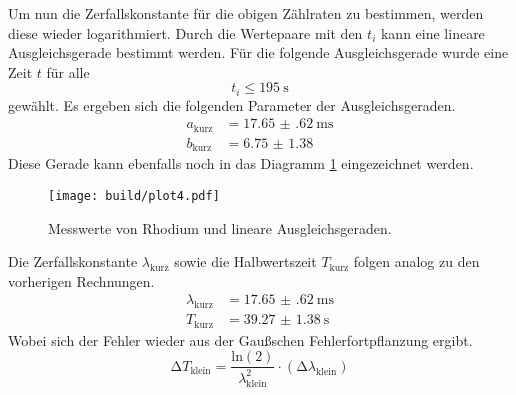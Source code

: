 Um nun die Zerfallskonstante für die obigen Zählraten zu bestimmen, werden diese wieder logarithmiert. Durch die Wertepaare mit den $t_{i}$ kann eine lineare 
Ausgleichsgerade bestimmt werden. Für die folgende Ausgleichsgerade wurde eine Zeit $t$ für alle
\begin{equation*}
t_{i} \leq \SI{195}{\second}
\end{equation*}
gewählt.
Es ergeben sich die folgenden Parameter der Ausgleichsgeraden.
\begin{align}
a_{\text{kurz}} &= \SI{17.65(62)}{\milli\second}\\
b_{\text{kurz}} &= \SI{6.75(138)}{}
\end{align}
Diese Gerade kann ebenfalls noch in das Diagramm \ref{fig:plot4} eingezeichnet werden.
\begin{figure}[ht!]
  \centering
  \texttt{[image: build/plot4.pdf]}
  \caption{Messwerte von Rhodium und lineare Ausgleichsgeraden.}
  \label{fig:plot4}
\end{figure}
Die Zerfallskonstante $\lambda_{\text{kurz}}$ sowie die Halbwertszeit $T_{\text{kurz}}$ folgen analog zu den vorherigen Rechnungen.
\begin{align}
\lambda_{\text{kurz}} &= \SI{17.65(62)}{\milli\second} \\
T_{\text{kurz}} &= \SI{39.27(138)}{\second} 
\end{align}
Wobei sich der Fehler wieder aus der Gaußschen Fehlerfortpflanzung ergibt.
\begin{equation}
\increment T_{\text{klein}} = \frac{\text{ln}(2)}{\lambda_{\text{klein}}^{2}} \cdot (\increment \lambda_{\text{klein}})
\end{equation}